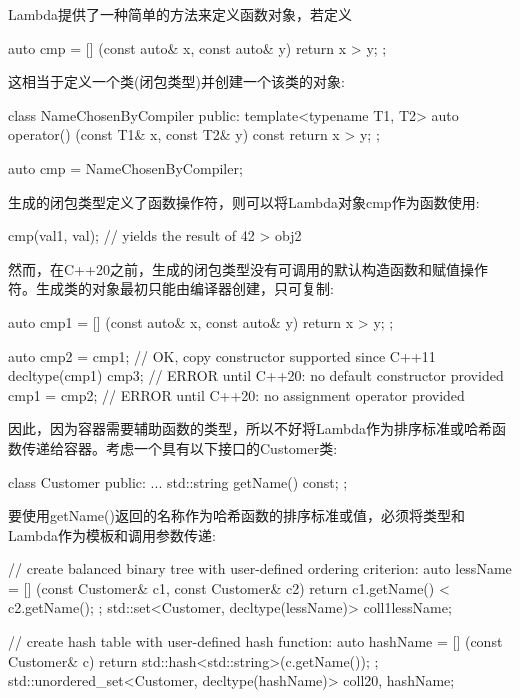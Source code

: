 Lambda提供了一种简单的方法来定义函数对象，若定义

\begin{cpp}
auto cmp = [] (const auto& x, const auto& y) {
				return x > y;
			};
\end{cpp}

这相当于定义一个类(闭包类型)并创建一个该类的对象:

\begin{cpp}
class NameChosenByCompiler {
	public:
	template<typename T1, T2>
	auto operator() (const T1& x, const T2& y) const {
		return x > y;
	}
};

auto cmp = NameChosenByCompiler{};
\end{cpp}

生成的闭包类型定义了函数操作符，则可以将Lambda对象cmp作为函数使用:

\begin{cpp}
cmp(val1, val); // yields the result of 42 > obj2
\end{cpp}

然而，在C++20之前，生成的闭包类型没有可调用的默认构造函数和赋值操作符。生成类的对象最初只能由编译器创建，只可复制:

\begin{cpp}
auto cmp1 = [] (const auto& x, const auto& y) {
				return x > y;
			};
			
auto cmp2 = cmp1; // OK, copy constructor supported since C++11
decltype(cmp1) cmp3; // ERROR until C++20: no default constructor provided
cmp1 = cmp2; // ERROR until C++20: no assignment operator provided
\end{cpp}

因此，因为容器需要辅助函数的类型，所以不好将Lambda作为排序标准或哈希函数传递给容器。考虑一个具有以下接口的Customer类:

\begin{cpp}
class Customer
{
	public:
	...
	std::string getName() const;
};
\end{cpp}

要使用getName()返回的名称作为哈希函数的排序标准或值，必须将类型和Lambda作为模板和调用参数传递:

\begin{cpp}
// create balanced binary tree with user-defined ordering criterion:
auto lessName = [] (const Customer& c1, const Customer& c2) {
	return c1.getName() < c2.getName();
};
std::set<Customer, decltype(lessName)> coll1{lessName};

// create hash table with user-defined hash function:
auto hashName = [] (const Customer& c) {
	return std::hash<std::string>{}(c.getName());
};
std::unordered_set<Customer, decltype(hashName)> coll2{0, hashName};
\end{cpp}

